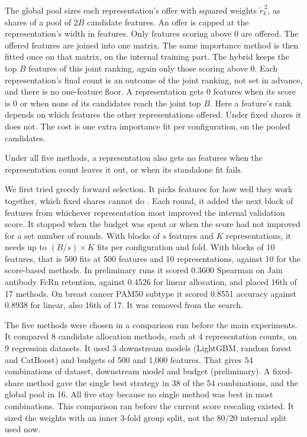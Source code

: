 The global pool sizes each representation's offer with squared weights $\tilde r_k^{\,2}$, as shares of a pool of $2B$ candidate features. An offer is capped at the representation's width in features. Only features scoring above 0 are offered. The offered features are joined into one matrix. The same importance method is then fitted once on that matrix, on the internal training part. The hybrid keeps the top $B$ features of this joint ranking, again only those scoring above 0. Each representation's final count is an outcome of the joint ranking, not set in advance, and there is no one-feature floor. A representation gets 0 features when its score is 0 or when none of its candidates reach the joint top $B$. Here a feature's rank depends on which features the other representations offered. Under fixed shares it does not. The cost is one extra importance fit per configuration, on the pooled candidates.

Under all five methods, a representation also gets no features when the representation count leaves it out, or when its standalone fit fails.

We first tried greedy forward selection. It picks features for how well they work together, which fixed shares cannot do \citep{Kohavi1997, Guyon2003}. Each round, it added the next block of features from whichever representation most improved the internal validation score. It stopped when the budget was spent or when the score had not improved for a set number of rounds. With blocks of $s$ features and $K$ representations, it needs up to $(B/s) \times K$ fits per configuration and fold. With blocks of 10 features, that is 500 fits at 500 features and 10 representations, against 10 for the score-based methods. In preliminary runs it scored 0.3600 Spearman on Jain antibody FcRn retention, against 0.4526 for linear allocation, and placed 16th of 17 methods. On breast cancer PAM50 subtype it scored 0.8551 accuracy against 0.8938 for linear, also 16th of 17. It was removed from the search.

The five methods were chosen in a comparison run before the main experiments. It compared 8 candidate allocation methods, each at 4 representation counts, on 9 regression datasets. It used 3 downstream models (LightGBM, random forest and CatBoost) and budgets of 500 and 1,000 features. That gives 54 combinations of dataset, downstream model and budget (preliminary). A fixed-share method gave the single best strategy in 38 of the 54 combinations, and the global pool in 16. All five stay because no single method was best in most combinations. This comparison ran before the current score rescaling existed. It sized the weights with an inner 3-fold group split, not the 80/20 internal split used now.

